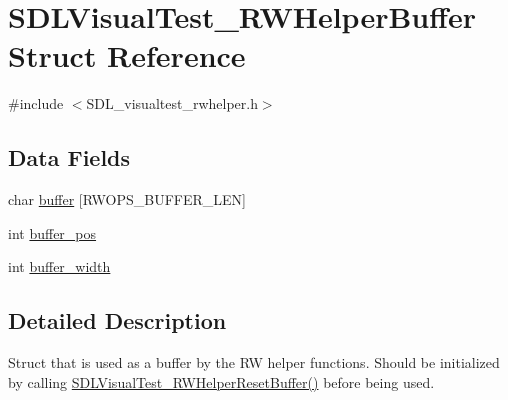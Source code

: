 \hypertarget{struct_s_d_l_visual_test___r_w_helper_buffer}{\section{S\-D\-L\-Visual\-Test\-\_\-\-R\-W\-Helper\-Buffer Struct Reference}
\label{struct_s_d_l_visual_test___r_w_helper_buffer}
}


{\ttfamily \#include $<$S\-D\-L\-\_\-visualtest\-\_\-rwhelper.\-h$>$}

\subsection*{Data Fields}
\begin{DoxyCompactItemize}
\item 
char \hyperlink{struct_s_d_l_visual_test___r_w_helper_buffer_a5b528063c1aaa0e626f5d5e49de5baad}{buffer} \mbox{[}R\-W\-O\-P\-S\-\_\-\-B\-U\-F\-F\-E\-R\-\_\-\-L\-E\-N\mbox{]}
\item 
int \hyperlink{struct_s_d_l_visual_test___r_w_helper_buffer_a8a37d41b7b076eced766d7418450477d}{buffer\-\_\-pos}
\item 
int \hyperlink{struct_s_d_l_visual_test___r_w_helper_buffer_adb2920cd89b7b8b8b014290e82746d8c}{buffer\-\_\-width}
\end{DoxyCompactItemize}


\subsection{Detailed Description}
Struct that is used as a buffer by the R\-W helper functions. Should be initialized by calling \hyperlink{rwhelper_8c_aa7878508e6d851b11dc1d1186324064a}{S\-D\-L\-Visual\-Test\-\_\-\-R\-W\-Helper\-Reset\-Buffer()} before being used. 

